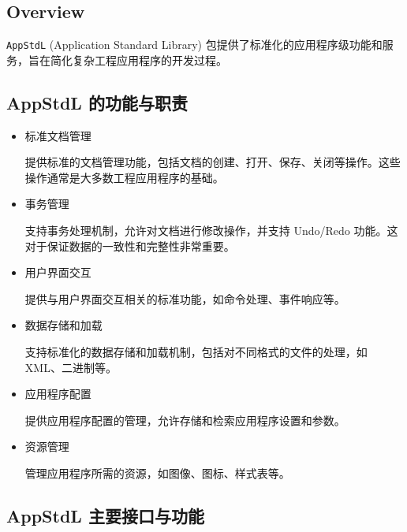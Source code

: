 \documentclass[11pt]{article}
\begin{document}
\subsection{Overview}
\label{sec:orgdf5016e}

\texttt{AppStdL} (Application Standard Library) 包提供了标准化的应用程序级功能和服务，旨在简化复杂工程应用程序的开发过程。
\subsection{AppStdL 的功能与职责}
\label{sec:org4e4179a}

\begin{itemize}
\item 标准文档管理

提供标准的文档管理功能，包括文档的创建、打开、保存、关闭等操作。这些操作通常是大多数工程应用程序的基础。

\item 事务管理

支持事务处理机制，允许对文档进行修改操作，并支持 Undo/Redo 功能。这对于保证数据的一致性和完整性非常重要。

\item 用户界面交互

提供与用户界面交互相关的标准功能，如命令处理、事件响应等。

\item 数据存储和加载

支持标准化的数据存储和加载机制，包括对不同格式的文件的处理，如 XML、二进制等。

\item 应用程序配置

提供应用程序配置的管理，允许存储和检索应用程序设置和参数。

\item 资源管理

管理应用程序所需的资源，如图像、图标、样式表等。
\end{itemize}
\subsection{AppStdL 主要接口与功能}
\label{sec:org129e249}
\end{document}
